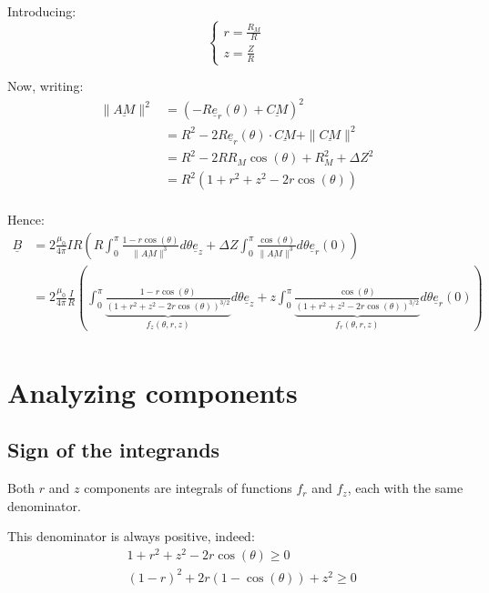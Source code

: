 \documentclass[a4paper,11pt,twoside,titlepage,openright]{book}
\numberwithin{equation}{section}
\newcommand{\ud}[1]{\underline{#1}}
\begin{document}
Introducing:
$$
\left\{
\begin{array}{ll}
    r = \frac{R_M}{R}\\
    z = \frac{Z}{R}
\end{array}
\right.
$$

Now, writing:
$$
\begin{array}{ll}
    \|\ud{AM}\|^2
    & = \left(-R\ud{e}_r(\theta) + \ud{CM}\right)^2\\
    & = R^2 - 2R\ud{e}_r(\theta)\cdot\ud{CM} + \|\ud{CM}\|^2\\
    & = R^2 - 2RR_M\cos(\theta) + R_M^2 + \Delta Z^2\\
    & = R^2\left(1 + r^2 + z^2 - 2r\cos(\theta)\right)\\
\end{array}
$$

Hence:
$$
\begin{array}{ll}
    \ud{B}
    & = 2\frac{\mu_0}{4\pi}IR\left(
    R\int_{0}^{\pi}\frac{1-r\cos(\theta)}{\| \ud{AM} \|^3}d\theta\ud{e}_z
    + \Delta Z\int_{0}^{\pi}\frac{\cos(\theta)}{\| \ud{AM} \|^3}d\theta\ud{e}_r(0)
    \right)\\
    & = 2\frac{\mu_0}{4\pi}\frac{I}{R}\left(
    \int_{0}^{\pi}\underbrace{
        \frac{1-r\cos(\theta)}
        {\left(1 + r^2 + z^2 - 2r\cos(\theta)\right)^{3/2}}
    }_{f_z(\theta, r, z)}
    d\theta\ud{e}_z
    + z\int_{0}^{\pi}\underbrace{
        \frac{\cos(\theta)}
        {\left(1 + r^2 + z^2 - 2r\cos(\theta)\right)^{3/2}}
    }_{f_r(\theta, r, z)}
    d\theta\ud{e}_r(0)
    \right)\\
\end{array}
$$

\section{Analyzing components}


\subsection{Sign of the integrands}
Both $r$ and $z$ components are integrals of functions $f_r$ and $f_z$, each
with the same denominator.

This denominator is always positive, indeed:
$$
\begin{array}{ll}
    & 1 + r^2 + z^2 - 2r\cos(\theta) \geq 0\\
    & (1 - r)^2  + 2r(1-\cos(\theta)) + z^2 \geq 0\\
\end{array}
$$
\end{document}
